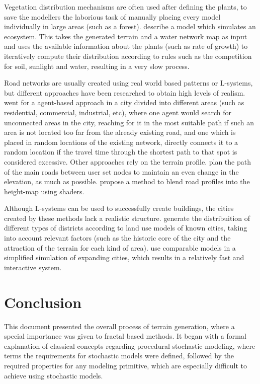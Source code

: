 \documentclass{acmtog}
\begin{document}
Vegetation distribution mechanisms are often used after defining the plants, to save the modellers the laborious task of manually placing every model individually in large areas (such as a forest). \cite{Deussen98} describe a model which simulates an ecosystem. This takes the generated terrain and a water network map as input and uses the available information about the plants (such as rate of growth) to iteratively compute their distribution according to rules such as the competition for soil, sunlight and water, resulting in a very slow process.

Road networks are usually created using real world based patterns or L-systems, but different approaches have been researched to obtain high levels of realism. \cite{Lechner03} went for a agent-based approach in a city divided into different areas (such as residential, commercial, industrial, etc), where one agent would search for unconnected areas in the city, reaching for it in the most suitable path if such an area is not located too far from the already existing road, and one which is placed in random locations of the existing network, directly connects it to a random location if the travel time through the shortest path to that spot is considered excessive. Other approaches rely on the terrain profile. \cite{Kelly07} plan the path of the main roads between user set nodes to maintain an even change in the elevation, as much as possible. \cite{Bruneton08} propose a method to blend road profiles into the height-map using shaders.

Although L-systems can be used to successfully create buildings, the cities created by these methods lack a realistic structure. \cite{Groenewegen09} generate the distribuition of different types of districts according to land use models of known cities, taking into account relevant factors (such as the historic core of the city and the attraction of the terrain for each kind of area). \cite{Weber09} use comparable models in a simplified simulation of expanding cities, which results in a relatively fast and interactive system.

\section{Conclusion}
This document presented the overall process of terrain generation, where a special importance was given to fractal based methods. It began with a formal explanation of classical concepts regarding procedural stochastic modeling, where terms the requirements for stochastic models were defined, followed by the required properties for any modeling primitive, which are especially difficult to achieve using stochastic models.
\end{document}
